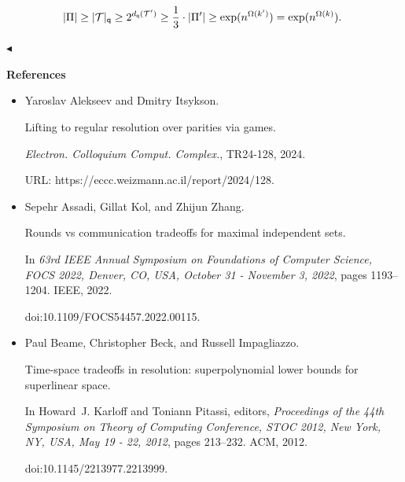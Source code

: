 \documentclass[10pt,a4paper]{article}
\begin{document}
\[\begin{gathered}
|\Pi|\geq|\mathcal{T}|_{\mathsf{q}}\geq 2^{d_{\mathsf{q}}(\mathcal{T}^{\prime}%
)}\geq\frac{1}{3}\cdot|\Pi^{\prime}|\geq\exp(n^{\Omega(k^{\prime})})=\exp(n^{%
\Omega(k)}).\
\end{gathered}\]


$\blacktriangleleft$\par






\par\medskip\noindent\textbf{References}\par



\begin{itemize}


\item[] 
[1]

Yaroslav Alekseev and Dmitry Itsykson.


Lifting to regular resolution over parities via games.


\emph{Electron. Colloquium Comput. Complex.}, TR24-128, 2024.


URL: https://eccc.weizmann.ac.il/report/2024/128.





\item[] 
[2]

Sepehr Assadi, Gillat Kol, and Zhijun Zhang.


Rounds vs communication tradeoffs for maximal independent sets.


In \emph{63rd IEEE Annual Symposium on Foundations of Computer
Science, FOCS 2022, Denver, CO, USA, October 31 - November 3, 2022}, pages
1193–1204. IEEE, 2022.


doi:10.1109/FOCS54457.2022.00115.





\item[] 
[3]

Paul Beame, Christopher Beck, and Russell Impagliazzo.


Time-space tradeoffs in resolution: superpolynomial lower bounds for
superlinear space.


In Howard J. Karloff and Toniann Pitassi, editors, \emph{Proceedings
of the 44th Symposium on Theory of Computing Conference, STOC 2012, New
York, NY, USA, May 19 - 22, 2012}, pages 213–232. ACM, 2012.


doi:10.1145/2213977.2213999.






\end{itemize}
\end{document}
